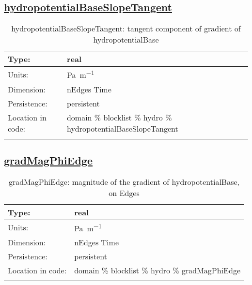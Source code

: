 \subsection[hydropotentialBaseSlopeTangent]{\hyperref[sec:var_tab_hydro]{hydropotentialBaseSlopeTangent}}
\label{subsec:var_sec_hydro_hydropotentialBaseSlopeTangent}
\begin{center}
\begin{longtable}{| p{2.0in} | p{4.0in} |}
        \hline 
        Type: & real \\
        \hline 
        Units: & \si{Pa.m^{-1}} \\
        \hline 
        Dimension: & nEdges Time \\
        \hline 
        Persistence: & persistent \\
        \hline 
         Location in code: & domain \% blocklist \% hydro \% hydropotentialBaseSlopeTangent \\
         \hline 
    \caption{hydropotentialBaseSlopeTangent: tangent component of gradient of hydropotentialBase}
\end{longtable}
\end{center}
\subsection[gradMagPhiEdge]{\hyperref[sec:var_tab_hydro]{gradMagPhiEdge}}
\label{subsec:var_sec_hydro_gradMagPhiEdge}
\begin{center}
\begin{longtable}{| p{2.0in} | p{4.0in} |}
        \hline 
        Type: & real \\
        \hline 
        Units: & \si{Pa.m^{-1}} \\
        \hline 
        Dimension: & nEdges Time \\
        \hline 
        Persistence: & persistent \\
        \hline 
         Location in code: & domain \% blocklist \% hydro \% gradMagPhiEdge \\
         \hline 
    \caption{gradMagPhiEdge: magnitude of the gradient of hydropotentialBase, on Edges}
\end{longtable}
\end{center}
